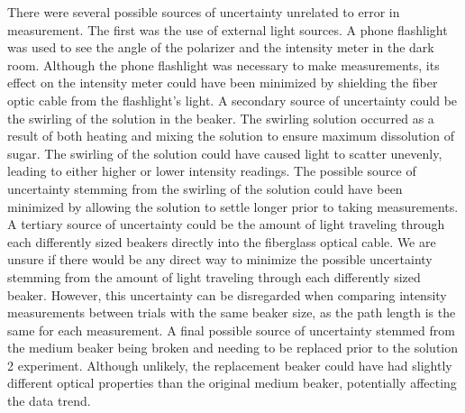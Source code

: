 There were several possible sources of uncertainty unrelated to error in measurement. The first was the use of external light sources. A phone flashlight was used to see the angle of the polarizer and the intensity meter in the dark room. Although the phone flashlight was necessary to make measurements, its effect on the intensity meter could have been minimized by shielding the fiber optic cable from the flashlight's light.
A secondary source of uncertainty could be the swirling of the solution in the beaker. The swirling solution occurred as a result of both heating and mixing the solution to ensure maximum dissolution of sugar. The swirling of the solution could have caused light to scatter unevenly, leading to either higher or lower intensity readings. The possible source of uncertainty stemming from the swirling of the solution could have been minimized by allowing the solution to settle longer prior to taking measurements.
A tertiary source of uncertainty could be the amount of light traveling through each differently sized beakers directly into the fiberglass optical cable. We are unsure if there would be any direct way to minimize the possible uncertainty stemming from the amount of light traveling through each differently sized beaker. However, this uncertainty can be disregarded when comparing intensity measurements between trials with the same beaker size, as the path length is the same for each measurement. A final possible source of uncertainty stemmed from the medium beaker being broken and needing to be replaced prior to the solution 2 experiment. Although unlikely, the replacement beaker could have had slightly different optical properties than the original medium beaker, potentially affecting the data trend.